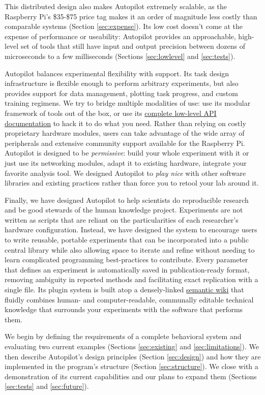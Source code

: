 This distributed design also makes Autopilot extremely scalable, as the Raspberry Pi's \$35-\$75 price tag makes it an order of magnitude less costly than comparable systems (Section \ref{sec:expense}). Its low cost doesn't come at the expense of performance or useability: Autopilot provides an approachable, high-level set of tools that still have input and output precision between dozens of microseconds to a few milliseconds (Sections \ref{sec:lowlevel} and \ref{sec:tests}).

Autopilot balances experimental flexibility with support. Its task design infrastructure is flexible enough to perform arbitrary experiments, but also provides support for data management, plotting task progress, and custom training regimens. We try to bridge multiple modalities of use: use its modular framework of tools out of the box, or use its \href{https://docs.auto-pi-lot.com}{complete low-level API documentation} to hack it to do what you need. Rather than relying on costly proprietary hardware modules, users can take advantage of the wide array of peripherals and extensive community support available for the Raspberry Pi. Autopilot is designed to be \textit{permissive}: build your whole experiment with it or just use its networking modules, adapt it to existing hardware, integrate your favorite analysis tool. We designed Autopilot to \textit{play nice} with other software libraries and existing practices rather than force you to retool your lab around it.

Finally, we have designed Autopilot to help scientists do reproducible research and be good stewards of the human knowledge project. Experiments are not written as scripts that are reliant on the particularities of each researcher's hardware configuration. Instead, we have designed the system to encourage users to write reusable, portable experiments that can be incorporated into a public central library while also allowing space to iterate and refine without needing to learn complicated programming best-practices to contribute. Every parameter that defines an experiment is automatically saved in  publication-ready format, removing ambiguity in reported methods and facilitating exact replication with a single file. Its plugin system is built atop a densely-linked \href{https://wiki-auto-pi-lot.com}{semantic wiki} that fluidly combines human- and computer-readable, communally editable technical knowledge that surrounds your experiments with the software that performs them.

We begin by defining the requirements of a complete behavioral system and evaluating two current examples (Sections \ref{sec:existing} and \ref{sec:limitations}). We then describe Autopilot's design principles (Section \ref{sec:design}) and how they are implemented in the program's structure (Section \ref{sec:structure}). We close with a demonstration of its current capabilities and our plans to expand them (Sections \ref{sec:tests} and \ref{sec:future}).
